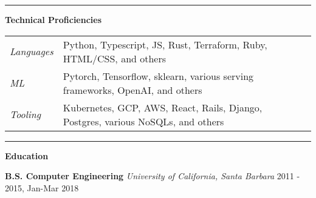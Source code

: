 \documentclass[10pt]{letter}
\begin{document}
\vspace{4px}
\hrule
\textbf{Technical Proficiencies}

\begin{tabular}{lll}
  \textit{Languages} & Python, Typescript, JS, Rust, Terraform, Ruby, HTML/CSS, and others \\
  \textit{ML} & Pytorch, Tensorflow, sklearn, various serving frameworks, OpenAI, and others \\
  \textit{Tooling} &  Kubernetes, GCP, AWS, React, Rails, Django, Postgres, various NoSQLs, and others \\
\end{tabular}

\vspace{4px}
\hrule
\textbf{Education}

\hspace*{2px}
\textbf{B.S. Computer Engineering}
\textit{University of California, Santa Barbara}
\hfill
2011 - 2015, Jan-Mar 2018
\end{document}
